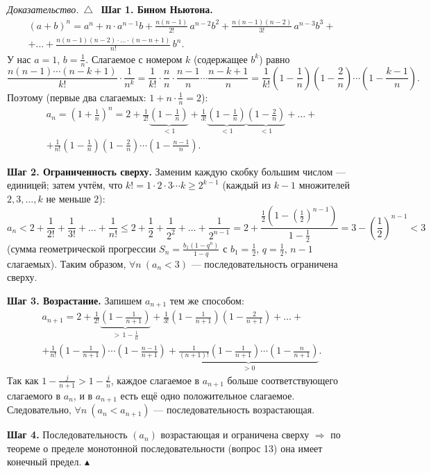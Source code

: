 \documentclass[a4paper,11pt]{article}
\newenvironment{dok}
  {\par\smallskip\noindent\textit{Доказательство.}\ $\triangle$\ \ignorespaces}
  {\unskip\nobreak\hfill$\blacktriangle$\par\smallskip}
\begin{document}
\begin{dok}
\textbf{Шаг 1. Бином Ньютона.}
\begin{multline*}
  (a + b)^n = a^n + n \cdot a^{n-1}b + \frac{n(n-1)}{2!}\,a^{n-2}b^2
    + \frac{n(n-1)(n-2)}{3!}\,a^{n-3}b^3 + {}\\
  + \ldots + \frac{n(n-1)(n-2)\cdot\ldots\cdot(n-n+1)}{n!}\,b^n.
\end{multline*}
У нас $a = 1$, $b = \frac{1}{n}$. Слагаемое с номером $k$ (содержащее $b^k$) равно
\[
  \frac{n(n-1)\cdots(n-k+1)}{k!} \cdot \frac{1}{n^k}
  = \frac{1}{k!} \cdot \frac{n}{n} \cdot \frac{n-1}{n} \cdots \frac{n-k+1}{n}
  = \frac{1}{k!}\left(1 - \frac{1}{n}\right)\left(1 - \frac{2}{n}\right)\cdots\left(1 - \frac{k-1}{n}\right).
\]
Поэтому (первые два слагаемых: $1 + n \cdot \frac1n = 2$):
\begin{multline*}
  a_n = \left(1 + \frac{1}{n}\right)^n
  = 2 + \frac{1}{2!}\underbrace{\left(1 - \frac{1}{n}\right)}_{<1}
       + \frac{1}{3!}\underbrace{\left(1 - \frac{1}{n}\right)}_{<1}\underbrace{\left(1 - \frac{2}{n}\right)}_{<1}
       + \ldots + {}\\
  + \frac{1}{n!}\left(1 - \frac{1}{n}\right)\left(1 - \frac{2}{n}\right)\cdots\left(1 - \frac{n-1}{n}\right).
\end{multline*}

\textbf{Шаг 2. Ограниченность сверху.} Заменим каждую скобку большим числом --- единицей; затем учтём, что
$k! = 1 \cdot 2 \cdot 3 \cdots k \ge 2^{k-1}$ (каждый из $k - 1$ множителей $2, 3, \dots, k$ не меньше $2$):
\[
  a_n < 2 + \frac{1}{2!} + \frac{1}{3!} + \ldots + \frac{1}{n!}
  \le 2 + \frac{1}{2} + \frac{1}{2^2} + \ldots + \frac{1}{2^{n-1}}
  = 2 + \frac{\frac{1}{2}\left(1 - \left(\frac{1}{2}\right)^{n-1}\right)}{1 - \frac{1}{2}}
  = 3 - \left(\frac{1}{2}\right)^{n-1} < 3
\]
(сумма геометрической прогрессии $S_n = \frac{b_1(1 - q^n)}{1 - q}$ с $b_1 = \frac12$, $q = \frac12$, $n - 1$ слагаемых).
Таким образом, $\forall n\ (a_n < 3)$ --- последовательность ограничена сверху.

\textbf{Шаг 3. Возрастание.} Запишем $a_{n+1}$ тем же способом:
\begin{multline*}
  a_{n+1} = 2 + \frac{1}{2!}\underbrace{\left(1 - \frac{1}{n+1}\right)}_{>\,1 - \frac{1}{n}}
    + \frac{1}{3!}\left(1 - \frac{1}{n+1}\right)\left(1 - \frac{2}{n+1}\right) + \ldots + {}\\
  + \frac{1}{n!}\left(1 - \frac{1}{n+1}\right)\cdots\left(1 - \frac{n-1}{n+1}\right)
  + \underbrace{\frac{1}{(n+1)!}\left(1 - \frac{1}{n+1}\right)\cdots\left(1 - \frac{n}{n+1}\right)}_{>0}.
\end{multline*}
Так как $1 - \frac{j}{n+1} > 1 - \frac{j}{n}$, каждое слагаемое в $a_{n+1}$ больше соответствующего слагаемого в $a_n$,
и в $a_{n+1}$ есть ещё одно положительное слагаемое. Следовательно, $\forall n\ (a_n < a_{n+1})$ --- последовательность возрастающая.

\textbf{Шаг 4.} Последовательность $(a_n)$ возрастающая и ограничена сверху $\Rightarrow$ по теореме о пределе монотонной
последовательности (вопрос 13) она имеет конечный предел.
\end{dok}
\end{document}
